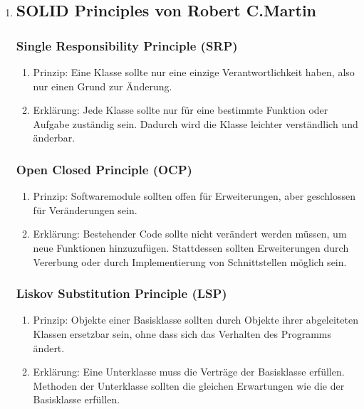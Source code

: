 \documentclass{article}
\begin{document}
\begin{enumerate}[label=\alph*)]
\item \subsection*{SOLID Principles von Robert C.Martin}
   \subsubsection*{Single Responsibility Principle (SRP)}
   \begin{enumerate}[label=\arabic*)]
   		\item Prinzip: Eine Klasse sollte nur eine einzige Verantwortlichkeit haben, also nur einen Grund zur Änderung.
		\item Erklärung: Jede Klasse sollte nur für eine bestimmte Funktion oder Aufgabe zuständig sein. Dadurch wird die Klasse leichter verständlich und änderbar.
   
   \end{enumerate}
   \subsubsection*{Open Closed Principle (OCP)}
   \begin{enumerate}[label=\arabic*)]
   		\item Prinzip: Softwaremodule sollten offen für Erweiterungen, aber geschlossen für Veränderungen sein.
		\item Erklärung: Bestehender Code sollte nicht verändert werden müssen, um neue Funktionen hinzuzufügen. Stattdessen sollten Erweiterungen durch Vererbung oder durch Implementierung von Schnittstellen möglich sein.
   
   \end{enumerate}
   \subsubsection*{Liskov Substitution Principle (LSP)}
   \begin{enumerate}[label=\arabic*)]
   		\item Prinzip: Objekte einer Basisklasse sollten durch Objekte ihrer abgeleiteten Klassen ersetzbar sein, ohne dass sich das Verhalten des Programms ändert.
		\item Erklärung: Eine Unterklasse muss die Verträge der Basisklasse erfüllen. Methoden der Unterklasse sollten die gleichen Erwartungen wie die der Basisklasse erfüllen.
   

\end{enumerate}
\end{enumerate}
\end{document}
